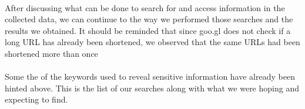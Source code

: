 \documentclass[12pt]{article}
\begin{document}
\paragraph{}
After discussing what can be done to search for and access information in the collected data, we can continue to the way we performed those searches and the results we obtained. It should be reminded that since goo.gl does not check if a long URL has already been shortened, we observed that the same URLs had been shortened more than once

\paragraph{}
Some the of the keywords used to reveal sensitive information have already been hinted above. This is the list of our searches along with what we were hoping and expecting to find.
\end{document}
